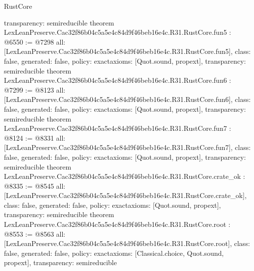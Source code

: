 \begin{lexlean}{RustCore}
\begin{coremodule}
{  transparency: semireducible
}
theorem LexLeanPreserve.Cac32f86b04c5a5e4c84d9f46beb16e4c.R31.RustCore.fun5 : @6550 := @7298 {
  all: [LexLeanPreserve.Cac32f86b04c5a5e4c84d9f46beb16e4c.R31.RustCore.fun5],
  class: false,
  generated: false,
  policy: exact{axioms: [Quot.sound, propext]},
  transparency: semireducible
}
theorem LexLeanPreserve.Cac32f86b04c5a5e4c84d9f46beb16e4c.R31.RustCore.fun6 : @7299 := @8123 {
  all: [LexLeanPreserve.Cac32f86b04c5a5e4c84d9f46beb16e4c.R31.RustCore.fun6],
  class: false,
  generated: false,
  policy: exact{axioms: [Quot.sound, propext]},
  transparency: semireducible
}
theorem LexLeanPreserve.Cac32f86b04c5a5e4c84d9f46beb16e4c.R31.RustCore.fun7 : @8124 := @8331 {
  all: [LexLeanPreserve.Cac32f86b04c5a5e4c84d9f46beb16e4c.R31.RustCore.fun7],
  class: false,
  generated: false,
  policy: exact{axioms: [Quot.sound, propext]},
  transparency: semireducible
}
theorem LexLeanPreserve.Cac32f86b04c5a5e4c84d9f46beb16e4c.R31.RustCore.crate_ok : @8335 := @8545 {
  all: [LexLeanPreserve.Cac32f86b04c5a5e4c84d9f46beb16e4c.R31.RustCore.crate_ok],
  class: false,
  generated: false,
  policy: exact{axioms: [Quot.sound, propext]},
  transparency: semireducible
}
theorem LexLeanPreserve.Cac32f86b04c5a5e4c84d9f46beb16e4c.R31.RustCore.root : @8553 := @8563 {
  all: [LexLeanPreserve.Cac32f86b04c5a5e4c84d9f46beb16e4c.R31.RustCore.root],
  class: false,
  generated: false,
  policy: exact{axioms: [Classical.choice, Quot.sound, propext]},
  transparency: semireducible
}


\end{coremodule}
\end{lexlean}

